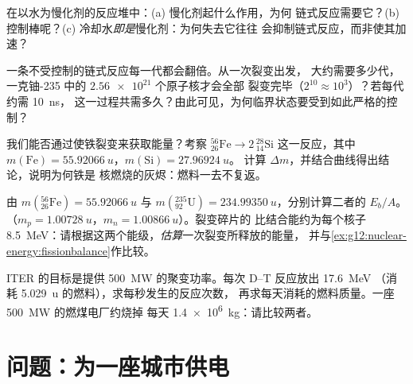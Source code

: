 \begin{exercise}[$\star\star$]\label{exo:g12:nuclear-energy:11}
在以水为慢化剂的反应堆中：(a) 慢化剂起什么作用，为何
链式反应需要它？(b) 控制棒呢？(c) 冷却水\emph{即是}慢化剂：为何失去它往往
会抑制链式反应，而非使其加速？
\end{exercise}

\begin{exercise}[$\star\star\star$]\label{exo:g12:nuclear-energy:12}
一条不受控制的链式反应每一代都会翻倍。从一次裂变出发，
大约需要多少代，一克铀-235 中的 $\num{2.56e21}$ 个原子核才会全部
裂变完毕（$2^{10} \approx 10^{3}$）？若每代约需 \qty{10}{ns}，
这一过程共需多久？由此可见，为何临界状态要受到如此严格的控制？
\end{exercise}

\begin{exercise}[$\star\star\star$]\label{exo:g12:nuclear-energy:13}
我们能否通过使铁裂变来获取能量？考察
${}^{56}_{26}\mathrm{Fe} \to 2\,{}^{28}_{14}\mathrm{Si}$ 这一反应，其中
$m(\mathrm{Fe}) = \qty{55.92066}{u}$，$m(\mathrm{Si}) = \qty{27.96924}{u}$。
计算 $\Delta m$，并结合曲线得出结论，说明为何铁是
核燃烧的灰烬：燃料一去不复返。
\end{exercise}

\begin{exercise}[$\star\star\star$]\label{exo:g12:nuclear-energy:14}
由 $m({}^{56}_{26}\mathrm{Fe}) = \qty{55.92066}{u}$ 与
$m({}^{235}_{92}\mathrm{U}) = \qty{234.99350}{u}$，分别计算二者的 $E_b/A$。
（$m_p = \qty{1.00728}{u}$，$m_n = \qty{1.00866}{u}$）。裂变碎片的
比结合能约为每个核子 \qty{8.5}{MeV}：请根据这两个能级，\emph{估算}一次裂变所释放的能量，
并与\cref{ex:g12:nuclear-energy:fissionbalance}作比较。
\end{exercise}

\begin{exercise}[$\star\star\star$]\label{exo:g12:nuclear-energy:15}
ITER 的目标是提供 \qty{500}{MW} 的聚变功率。每次 D--T 反应放出 \qty{17.6}{MeV}
（消耗 \qty{5.029}{u} 的燃料），求每秒发生的反应次数，
再求每天消耗的燃料质量。一座 \qty{500}{MW} 的燃煤电厂约烧掉
每天 \qty{1.4e6}{kg}：请比较两者。
\end{exercise}

\section{问题：为一座城市供电}

